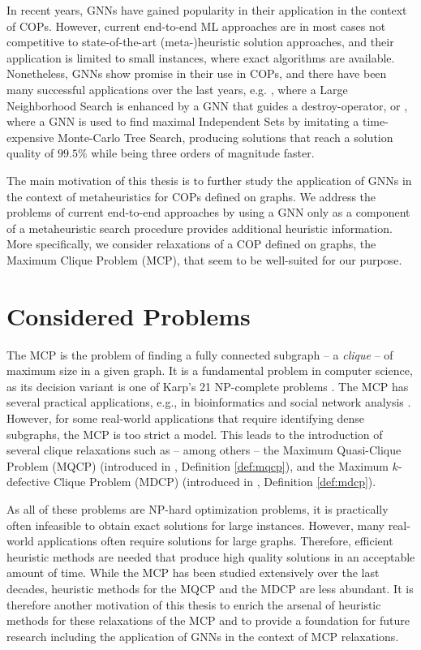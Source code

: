 \documentclass[draft,final]{vutinfth} %
\begin{document}
In recent years, GNNs have gained popularity in their application in the context of COPs. However, current end-to-end ML approaches are in most cases not competitive to state-of-the-art (meta-)heuristic solution approaches, and their application is limited to small instances, where exact algorithms are available. Nonetheless, GNNs show promise in their use in COPs, and there have been many successful applications over the last years, e.g. 
\cite{Oberweger2022}, where a Large Neighborhood Search is enhanced by a GNN that guides a destroy-operator, or \cite{NEURIPS2021_0db2e204}, where a GNN is used to find maximal Independent Sets by imitating a time-expensive Monte-Carlo Tree Search, producing solutions that reach a solution quality of $99.5\%$ while being three orders of magnitude faster. 

The main motivation of this thesis is to further study the application of GNNs in the context of metaheuristics for COPs defined on graphs. We address the problems of current end-to-end approaches by using a GNN only as a component of a metaheuristic search procedure provides additional heuristic information. More specifically, we consider relaxations of a COP defined on graphs, the Maximum Clique Problem (MCP), that seem to be well-suited for our purpose. 

\section{Considered Problems}\label{sec:considered-problems}
The MCP is the problem of finding a fully connected subgraph -- a \textit{clique} -- of maximum size in a given graph. It is a fundamental problem in computer science, as its decision variant is one of Karp's 21 NP-complete problems \cite{Karp1972}. The MCP has several practical applications, e.g.,  in bioinformatics \cite{Dognin2010} and social network analysis \cite{Pattillo_network_analysis_2013}. However, for some real-world applications that require identifying dense subgraphs, the MCP is too strict a model. This leads to the introduction of several clique relaxations such as -- among others -- the Maximum Quasi-Clique Problem (MQCP) (introduced in \cite{Abello2002}, Definition \ref{def:mqcp}), and the Maximum $k$-defective Clique Problem (MDCP) (introduced in \cite{Yu2006}, Definition \ref{def:mdcp}). 

As all of these problems are NP-hard optimization problems, it is practically often infeasible to obtain exact solutions for large instances. However, many real-world applications often require solutions for large graphs. Therefore, efficient heuristic methods are needed that produce high quality solutions in an acceptable amount of time. While the MCP has been studied extensively over the last decades, heuristic methods for the MQCP and the MDCP are less abundant. It is therefore another motivation of this thesis to enrich the arsenal of heuristic methods for these relaxations of the MCP and to provide a foundation for future research including the application of GNNs in the context of MCP relaxations. 
\end{document}
